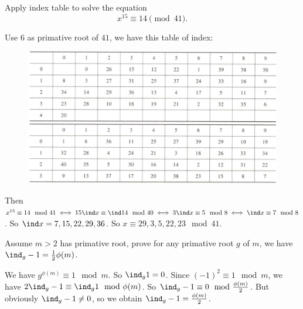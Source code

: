 \documentclass{ctexart}
\begin{document}
\begin{problem}\label{pro:3}
  Apply index table to solve the equation \[
    x^{15 } \equiv 14 \pmod{41}.
  \]
\end{problem}
\begin{solution}
  Use \(6\) as primative root of \(41\), we have this table of index:
  \begin{figure}
    \centering
    \includegraphics[width=\linewidth]{./mod41.png}
  \end{figure}
  Then \(x^{15} \equiv 14 \mod 41 \iff 15 \ind x \equiv \ind 14 \mod 40 \iff 3 \ind x \equiv 5 \mod 8 \iff \ind x \equiv 7 \mod 8\).
  So \(\ind x = 7,15,22,29,36\). So \(x \equiv 29,3,5,22,23 \mod 41\).
\end{solution}
\begin{problem}\label{pro:4}
  Assume \(m >2\) has primative root, prove for any primative root \(g\) of \(m\), we have \(\ind_g -1=\frac{1}{2}\phi(m)\).
\end{problem}
\begin{solution}
  We have \(g^{\phi(m)} \equiv 1 \mod m\).
  So \(\ind_g 1=0\).
  Since \((-1)^2 \equiv 1 \mod m\), we have \(2 \ind_g -1 \equiv \ind_g 1 \mod \phi(m)\).
  So \(\ind_g -1 \equiv 0 \mod \frac{\phi(m)}{2}\).
  But obviously \(\ind_g -1 \neq 0\), so we obtain \(\ind_g -1 = \frac{\phi(m)}{2}\).
\end{solution}
\end{document}

